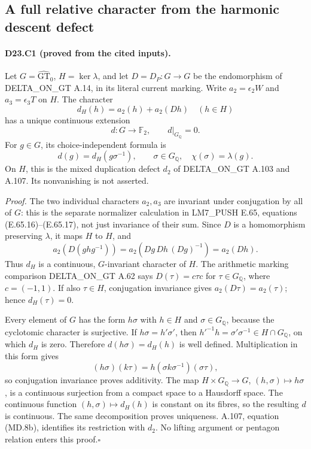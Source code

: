 
\subsection{A full relative character from the harmonic descent defect}

\paragraph{D23.C1 (proved from the cited inputs).}
Let $G=\widehat{\mathrm{GT}}_0$, $H=\ker\lambda$, and let
$D=D_P:G\to G$ be the endomorphism of
DELTA\_ON\_GT A.14, in its literal current marking.  Write
$a_2=\epsilon_2W$ and $a_3=\epsilon_3T$ on $H$.
The character
\[
 d_H(h)=a_2(h)+a_2(Dh)\quad(h\in H)
\]
has a unique continuous extension
\[
 d:G\longrightarrow\mathbb F_2,
 \qquad d|_{G_{\mathbb Q}}=0.
\]
For $g\in G$, its choice-independent formula is
\[
 d(g)=d_H(g\sigma^{-1}),\qquad
 \sigma\in G_{\mathbb Q},\quad\chi(\sigma)=\lambda(g).
\]
On $H$, this is the mixed duplication defect $d_2$ of
DELTA\_ON\_GT A.103 and A.107.  Its nonvanishing is not asserted.

\emph{Proof.}
The two individual characters $a_2,a_3$ are invariant under
conjugation by all of $G$: this is the separate normalizer
calculation in LM7\_PUSH E.65, equations (E.65.16)--(E.65.17),
not just invariance of their sum.  Since $D$ is a homomorphism
preserving $\lambda$, it maps $H$ to $H$, and
\[
 a_2(D(ghg^{-1}))=a_2(Dg\,Dh\,(Dg)^{-1})=a_2(Dh).
\]
Thus $d_H$ is a continuous, $G$-invariant character of $H$.
The arithmetic marking comparison DELTA\_ON\_GT A.62 says
$D(\tau)=c\tau c$ for $\tau\in G_{\mathbb Q}$, where
$c=(-1,1)$.  If also $\tau\in H$, conjugation invariance gives
$a_2(D\tau)=a_2(\tau)$; hence $d_H(\tau)=0$.

Every element of $G$ has the form $h\sigma$ with $h\in H$ and
$\sigma\in G_{\mathbb Q}$, because the cyclotomic character is
surjective.  If $h\sigma=h'\sigma'$, then
$h'^{-1}h=\sigma'\sigma^{-1}\in H\cap G_{\mathbb Q}$,
on which $d_H$ is zero.  Therefore $d(h\sigma)=d_H(h)$ is
well defined.  Multiplication in this form gives
\[
 (h\sigma)(k\tau)=h(\sigma k\sigma^{-1})(\sigma\tau),
\]
so conjugation invariance proves additivity.  The map
$H\times G_{\mathbb Q}\to G$, $(h,\sigma)\mapsto h\sigma$,
is a continuous surjection from a compact space to a Hausdorff
space.  The continuous function $(h,\sigma)\mapsto d_H(h)$ is
constant on its fibres, so the resulting $d$ is continuous.
The same decomposition proves uniqueness.  A.107, equation
(MD.8b), identifies its restriction with $d_2$.  No lifting
argument or pentagon relation enters this proof.\hfill$\square$

